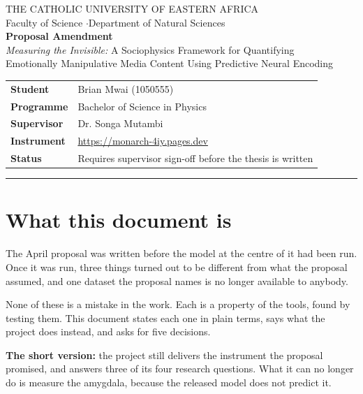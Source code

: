 \documentclass[11pt,a4paper]{article}
\begin{document}
\begin{center}
{\large THE CATHOLIC UNIVERSITY OF EASTERN AFRICA}\\[0.2em]
{\normalsize Faculty of Science \quad$\cdot$\quad Department of Natural Sciences}\\[1.4em]
{\Large\bfseries Proposal Amendment}\\[0.6em]
{\large \emph{Measuring the Invisible:} A Sociophysics Framework for Quantifying\\
Emotionally Manipulative Media Content Using Predictive Neural Encoding}\\[1.4em]
\end{center}

\begin{center}
\begin{tabular}{ll}
\textbf{Student} & Brian Mwai (1050555) \\
\textbf{Programme} & Bachelor of Science in Physics \\
\textbf{Supervisor} & Dr. Songa Mutambi \\
\textbf{Instrument} & \url{https://monarch-4iy.pages.dev} \\
\textbf{Status} & Requires supervisor sign-off before the thesis is written \\
\end{tabular}
\end{center}

\vspace{1em}
\hrule
\vspace{1em}

\section{What this document is}

The April proposal was written before the model at the centre of it had been run.
Once it was run, three things turned out to be different from what the proposal
assumed, and one dataset the proposal names is no longer available to anybody.

None of these is a mistake in the work. Each is a property of the tools, found by
testing them. This document states each one in plain terms, says what the project
does instead, and asks for five decisions.

\textbf{The short version:} the project still delivers the instrument the proposal
promised, and answers three of its four research questions. What it can no longer
do is measure the amygdala, because the released model does not predict it.
\end{document}
